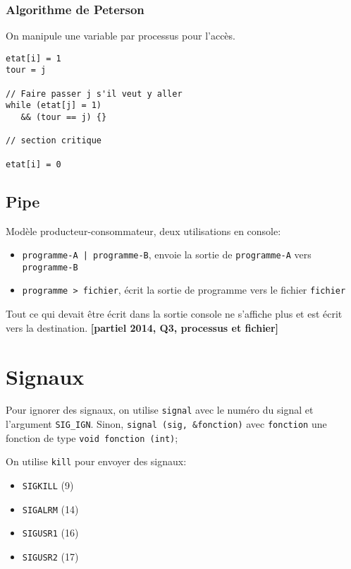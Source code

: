 \documentclass[9pt,a4paper,twocolumn]{article}
\begin{document}
    \subsubsection{Algorithme de Peterson}

    On manipule une variable par processus pour l'accès.
    \begin{lstlisting}[frame=shadowbox]
etat[i] = 1
tour = j

// Faire passer j s'il veut y aller
while (etat[j] = 1) 
   && (tour == j) {} 

// section critique

etat[i] = 0
    \end{lstlisting}

    \subsection{Pipe}

    Modèle producteur-consommateur, deux utilisations en console:
    \begin{itemize}
        \item \texttt{programme-A | programme-B}, envoie la sortie de \texttt{programme-A} vers \texttt{programme-B}
        \item \texttt{programme > fichier}, écrit la sortie de programme vers le fichier \texttt{fichier}
    \end{itemize}

    Tout ce qui devait être écrit dans la sortie console ne s'affiche plus et est écrit vers la destination. \textbf{[partiel 2014, Q3, processus et fichier]}



\section{Signaux}

    Pour ignorer des signaux, on utilise \texttt{signal} avec le numéro du signal et l'argument \texttt{SIG\_IGN}. Sinon, \texttt{signal (sig, \&fonction)} avec \texttt{fonction} une fonction de type \texttt{void fonction (int)};

    On utilise \texttt{kill} pour envoyer des signaux:
    \begin{itemize}
        \item \texttt{SIGKILL} (9)
        \item \texttt{SIGALRM} (14)
        \item \texttt{SIGUSR1} (16)
        \item \texttt{SIGUSR2} (17)
    \end{itemize}
\end{document}
